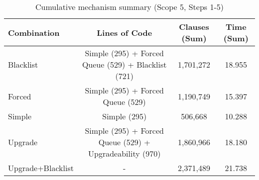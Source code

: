 \begin{table}[htbp]
\centering
\begin{tabular}{|l|c|c|c|}
\hline
\textbf{Combination} & \textbf{Lines of Code} & \textbf{Clauses (Sum)} & \textbf{Time (Sum)} \\
\hline
Blacklist & Simple (295) + Forced Queue (529) + Blacklist (721) & 1,701,272 & 18.955 \\
Forced & Simple (295) + Forced Queue (529) & 1,190,749 & 15.397 \\
Simple & Simple (295) & 506,668 & 10.288 \\
Upgrade & Simple (295) + Forced Queue (529) + Upgradeability (970) & 1,860,966 & 18.180 \\
Upgrade+Blacklist & - & 2,371,489 & 21.738 \\
\hline
\end{tabular}
\caption{Cumulative mechanism summary (Scope 5, Steps 1-5)}
\label{tab:cumulative_mechanism_summary_steps_5}
\end{table}